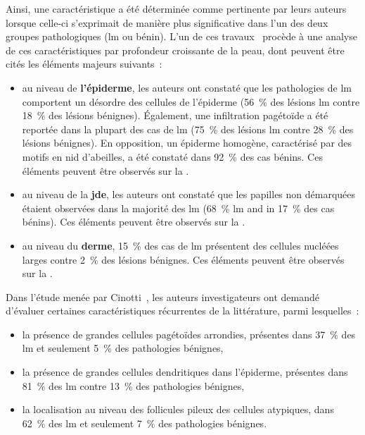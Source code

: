 Ainsi, une caractéristique a été déterminée comme pertinente par leurs auteurs lorsque celle-ci s'exprimait de manière plus significative dans l'un des deux groupes pathologiques (\gls{lm} ou bénin). L'un de ces travaux~\cite{Guitera2010} procède à une analyse de ces caractéristiques par profondeur croissante de la peau, dont peuvent être cités les éléments majeurs suivants~:
\begin{itemize}
    \item au niveau de \textbf{l'épiderme}, les auteurs ont constaté que les pathologies de \gls{lm} comportent un désordre des cellules de l'épiderme (56~\% des lésions \gls{lm} contre 18~\% des lésions bénignes). Également, une infiltration pagétoïde a été reportée dans la plupart des cas de \gls{lm} (75~\% des lésions \gls{lm} contre 28~\% des lésions bénignes). En opposition, un épiderme homogène, caractérisé par des motifs en nid d'abeilles, a été constaté dans 92~\% des cas bénins. Ces éléments peuvent être observés sur la .
    \item au niveau de la \textbf{\gls{jde}}, les auteurs ont constaté que les papilles non démarquées étaient observées dans la majorité des \gls{lm} (68~\% \gls{lm} and in 17~\% des cas bénins). Ces éléments peuvent être observés sur la .
    \item au niveau du \textbf{derme}, 15~\% des cas de \gls{lm} présentent des cellules nucléées larges contre 2~\% des lésions bénignes. Ces éléments peuvent être observés sur la .
\end{itemize}\par

Dans l'étude menée par Cinotti~, les auteurs investigateurs ont demandé d'évaluer certaines caractéristiques récurrentes de la littérature, parmi lesquelles~:
\begin{itemize}
    \item la présence de grandes cellules pagétoïdes arrondies, présentes dans 37~\% des \gls{lm} et seulement 5~\% des pathologies bénignes,
    \item la présence de grandes cellules dendritiques dans l'épiderme, présentes dans 81~\% des \gls{lm} contre 13~\% des pathologies bénignes,
    \item la localisation au niveau des follicules pileux des cellules atypiques, dans 62~\% des \gls{lm} et seulement 7~\% des pathologies bénignes.
\end{itemize}\par

